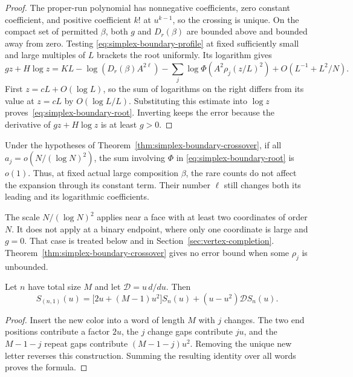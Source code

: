 \begin{proof}
The proper-run polynomial has nonnegative coefficients, zero constant
coefficient, and positive coefficient $k!$ at $u^{k-1}$, so the crossing
is unique. On the compact set of permitted $\beta$, both $g$ and
$D_r(\beta)$ are bounded above and bounded away from zero. Testing
\eqref{eq:simplex-boundary-profile} at fixed sufficiently small and large
multiples of $L$ brackets the root uniformly. Its logarithm gives
\[
gz+H\log z=KL-\log(D_r(\beta)A^{2\ell})
-\sum_j\log\Phi(A^2\rho_j(z/L)^2)
+O(L^{-1}+L^2/N).
\]
First $z=cL+O(\log L)$, so the sum of logarithms on the right differs
from its value at $z=cL$ by $O(\log L/L)$. Substituting this estimate
into $\log z$ proves~\eqref{eq:simplex-boundary-root}. Inverting keeps
the error because the derivative of $gz+H\log z$ is at least $g>0$.
\end{proof}

\begin{corollary}
\label{cor:simplex-rare-invisibility}
Under the hypotheses of Theorem~\ref{thm:simplex-boundary-crossover}, if
all $a_j=o(N/(\log N)^2)$, the sum involving $\Phi$ in
\eqref{eq:simplex-boundary-root} is $o(1)$. Thus, at fixed actual large
composition $\beta$, the rare counts do not affect the expansion through
its constant term. Their number $\ell$ still changes both its leading
and its logarithmic coefficients.
\end{corollary}

The scale $N/(\log N)^2$ applies near a face with at least two coordinates
of order $N$. It does not apply at a binary endpoint, where only one
coordinate is large and $g=0$. That case is treated below and in
Section~\ref{sec:vertex-completion}.
Theorem~\ref{thm:simplex-boundary-crossover} gives no error bound when some
$\rho_j$ is unbounded.

\begin{lemma}
\label{lem:singleton-insertion}
Let $n$ have total size $M$ and let $\mathcal D=u\,d/du$. Then
\[
S_{(n,1)}(u)=\bigl[2u+(M-1)u^2\bigr]S_n(u)
+(u-u^2)\mathcal D S_n(u).
\]
\end{lemma}

\begin{proof}
Insert the new color into a word of length $M$ with $j$ changes.
The two end positions contribute a factor $2u$, the $j$ change gaps
contribute $ju$, and the $M-1-j$ repeat gaps contribute
$(M-1-j)u^2$. Removing the unique new letter reverses this construction.
Summing the resulting identity over all words proves the formula.
\end{proof}

